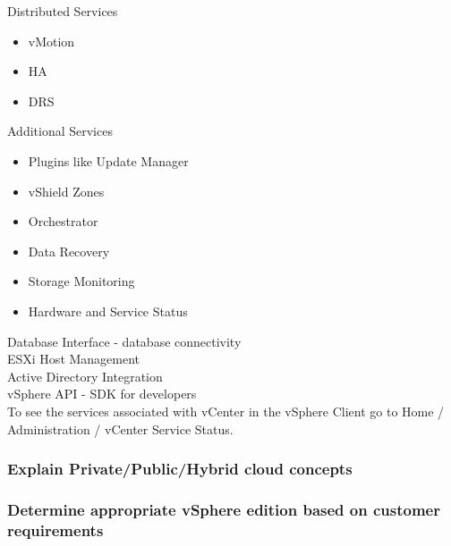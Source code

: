Distributed Services

\begin{itemize}
\item vMotion
\item HA
\item DRS
\end{itemize}

Additional Services

\begin{itemize}
\item Plugins like Update Manager
\item vShield Zones
\item Orchestrator
\item Data Recovery
\item Storage Monitoring
\item Hardware and Service Status
\end{itemize}

Database Interface - database connectivity\\

ESXi Host Management\\

Active Directory Integration\\

vSphere API - SDK for developers\\

To see the services associated with vCenter in the vSphere Client go to
Home / Administration / vCenter Service Status.

\subsubsection{Explain Private/Public/Hybrid cloud concepts}

\subsubsection{Determine appropriate vSphere edition based on customer requirements}
